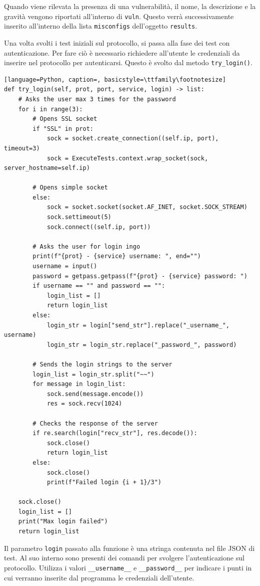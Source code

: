 \documentclass[12pt]{report}
\begin{document}
Quando viene rilevata la presenza di una vulnerabilità, il nome, la descrizione e la gravità vengono riportati all'interno di \lstinline{vuln}. Questo verrà successivamente inserito all'interno della lista \lstinline{misconfigs} dell'oggetto \lstinline{results}.

Una volta svolti i test iniziali sul protocollo, si passa alla fase dei test con autenticazione. Per fare ciò è necessario richiedere all'utente le credenziali da inserire nel protocollo per autenticarsi. Questo è svolto dal metodo \lstinline{try_login()}.
\begin{lstlisting}[language=Python, caption=, basicstyle=\ttfamily\footnotesize]
def try_login(self, prot, port, service, login) -> list:
    # Asks the user max 3 times for the password
    for i in range(3):
        # Opens SSL socket
        if "SSL" in prot:
            sock = socket.create_connection((self.ip, port), timeout=3)
            sock = ExecuteTests.context.wrap_socket(sock, server_hostname=self.ip)

        # Opens simple socket
        else:
            sock = socket.socket(socket.AF_INET, socket.SOCK_STREAM)
            sock.settimeout(5)
            sock.connect((self.ip, port))

        # Asks the user for login ingo
        print(f"{prot} - {service} username: ", end="")
        username = input()
        password = getpass.getpass(f"{prot} - {service} password: ")
        if username == "" and password == "":
            login_list = []
            return login_list
        else:
            login_str = login["send_str"].replace("_username_", username)
            login_str = login_str.replace("_password_", password)

        # Sends the login strings to the server
        login_list = login_str.split("~~")
        for message in login_list:
            sock.send(message.encode())
            res = sock.recv(1024)

        # Checks the response of the server
        if re.search(login["recv_str"], res.decode()):
            sock.close()
            return login_list
        else:
            sock.close()
            print(f"Failed login {i + 1}/3")

    sock.close()
    login_list = []
    print("Max login failed")
    return login_list
\end{lstlisting}
Il parametro \lstinline{login} passato alla funzione è una stringa contenuta nel file JSON di test. Al suo interno sono presenti dei comandi per svolgere l'autenticazione sul protocollo. Utilizza i valori \lstinline{__username__} e \lstinline{__password__} per indicare i punti in cui verranno inserite dal programma le credenziali dell'utente.
\end{document}
